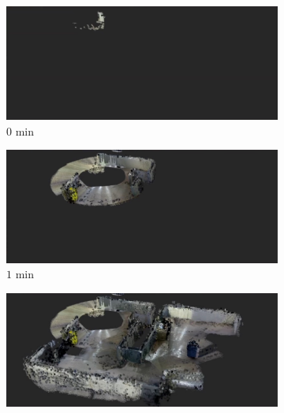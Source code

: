 \documentclass[smallextended]{svjour3}       %
\begin{document}

\begin{figure}[!t]
\centering
    	\begin{subfigure}[t]{0.95\columnwidth}
           	\centering
          	\includegraphics[width=\textwidth]{experiment_ogm3D_0min.jpg}
        		\caption{$0$ min}
    	\end{subfigure}
    	\begin{subfigure}[t]{0.95\columnwidth}
		\vspace*{0.03\columnwidth}
           	\centering
          	\includegraphics[width=\textwidth]{experiment_ogm3D_1min.jpg}
        		\caption{$1$ min}
    	\end{subfigure}
    	\begin{subfigure}[t]{0.95\columnwidth}
	\vspace*{0.03\columnwidth}
           	\centering
          	\includegraphics[width=\textwidth]{experiment_ogm3D_2min.jpg}

\end{subfigure}
\end{figure}
\end{document}

